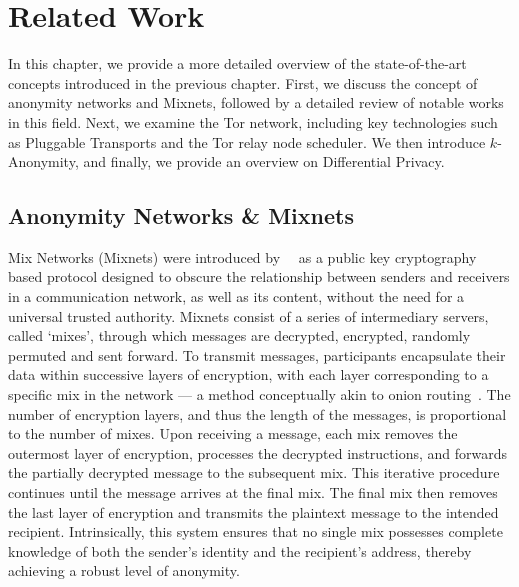
%

\chapter{Related Work}\label{cha:related_work}

In this chapter, we provide a more detailed overview of the state-of-the-art concepts introduced in the previous chapter. First, we discuss the concept of anonymity networks and Mixnets, followed by a detailed review of notable works in this field. Next, we examine the Tor network, including key technologies such as Pluggable Transports and the Tor relay node scheduler. We then introduce \(k\)-Anonymity, and finally, we provide an overview on Differential Privacy.

\section{Anonymity Networks \& Mixnets}\label{sec:anonymity_networks_mixnets}

Mix Networks (Mixnets) were introduced by~\citeauthor{Chaum2003}~\cite{Chaum2003} as a public key cryptography based protocol designed to obscure the relationship between senders and receivers in a communication network, as well as its content, without the need for a universal trusted authority. Mixnets consist of a series of intermediary servers, called `mixes', through which messages are decrypted, encrypted, randomly permuted and sent forward.
To transmit messages, participants encapsulate their data within successive layers of encryption, with each layer corresponding to a specific mix in the network — a method conceptually akin to onion routing~\cite{OnionRouting}. The number of encryption layers, and thus the length of the messages, is proportional to the number of mixes. Upon receiving a message, each mix removes the outermost layer of encryption, processes the decrypted instructions, and forwards the partially decrypted message to the subsequent mix. This iterative procedure continues until the message arrives at the final mix. The final mix then removes the last layer of encryption and transmits the plaintext message to the intended recipient. Intrinsically, this system ensures that no single mix possesses complete knowledge of both the sender's identity and the recipient's address, thereby achieving a robust level of anonymity.

